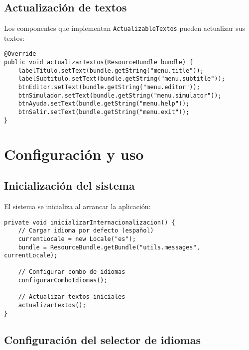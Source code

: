 \subsection{Actualización de textos}

Los componentes que implementan \texttt{ActualizableTextos} pueden actualizar sus textos:

\begin{lstlisting}[caption=Implementación de actualización de textos]
@Override
public void actualizarTextos(ResourceBundle bundle) {
    labelTitulo.setText(bundle.getString("menu.title"));
    labelSubtitulo.setText(bundle.getString("menu.subtitle"));
    btnEditor.setText(bundle.getString("menu.editor"));
    btnSimulador.setText(bundle.getString("menu.simulator"));
    btnAyuda.setText(bundle.getString("menu.help"));
    btnSalir.setText(bundle.getString("menu.exit"));
}
\end{lstlisting}

\section{Configuración y uso}

\subsection{Inicialización del sistema}

El sistema se inicializa al arrancar la aplicación:

\begin{lstlisting}[caption=Inicialización del sistema de i18n]
private void inicializarInternacionalizacion() {
    // Cargar idioma por defecto (español)
    currentLocale = new Locale("es");
    bundle = ResourceBundle.getBundle("utils.messages", currentLocale);
    
    // Configurar combo de idiomas
    configurarComboIdiomas();
    
    // Actualizar textos iniciales
    actualizarTextos();
}
\end{lstlisting}

\subsection{Configuración del selector de idiomas}

